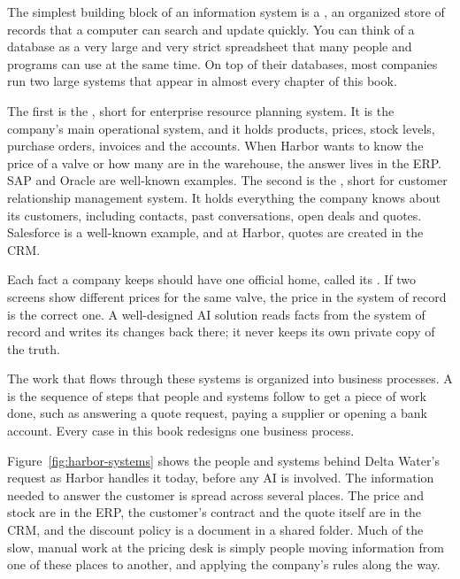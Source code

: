 The simplest building block of an information system is a , an organized store of records that a computer can search and update quickly. You can think of a database as a very large and very strict spreadsheet that many people and programs can use at the same time. On top of their databases, most companies run two large systems that appear in almost every chapter of this book.

The first is the , short for enterprise resource planning system. It is the company's main operational system, and it holds products, prices, stock levels, purchase orders, invoices and the accounts. When Harbor wants to know the price of a valve or how many are in the warehouse, the answer lives in the ERP. SAP and Oracle are well-known examples. The second is the , short for customer relationship management system. It holds everything the company knows about its customers, including contacts, past conversations, open deals and quotes. Salesforce is a well-known example, and at Harbor, quotes are created in the CRM.

Each fact a company keeps should have one official home, called its . If two screens show different prices for the same valve, the price in the system of record is the correct one. A well-designed AI solution reads facts from the system of record and writes its changes back there; it never keeps its own private copy of the truth.

The work that flows through these systems is organized into business processes. A  is the sequence of steps that people and systems follow to get a piece of work done, such as answering a quote request, paying a supplier or opening a bank account. Every case in this book redesigns one business process.

Figure~\ref{fig:harbor-systems} shows the people and systems behind Delta Water's request as Harbor handles it today, before any AI is involved. The information needed to answer the customer is spread across several places. The price and stock are in the ERP, the customer's contract and the quote itself are in the CRM, and the discount policy is a document in a shared folder. Much of the slow, manual work at the pricing desk is simply people moving information from one of these places to another, and applying the company's rules along the way.

